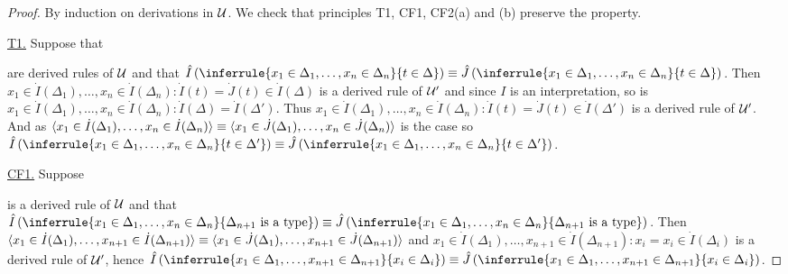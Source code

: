   \begin{proof}
    By induction on derivations in $\mathcal{U}$.
    We check that principles T1, CF1, CF2(a) and (b) preserve the property.

    \underline{T1.} Suppose that
    are derived rules of $\mathcal{U}$ and that $\hat{I}\left(\inferrule{x_1 \in \Delta_1, \dots, x_n \in \Delta_n}{t \in \Delta}\right) \equiv \hat{J}\left(\inferrule{x_1 \in \Delta_1, \dots, x_n \in \Delta_n}{t \in \Delta}\right)$.
    Then $x_1 \in \dot{I}(\Delta_1), \dots, x_n \in \dot{I}(\Delta_n) : \dot{I}(t) = \dot{J}(t) \in \dot{I}(\Delta)$ is a derived rule of $\mathcal{U}'$ and since $I$ is an interpretation, so is $x_1 \in \dot{I}(\Delta_1), \dots, x_n \in \dot{I}(\Delta_n) : \dot{I}(\Delta) = \dot{I}(\Delta')$.
    Thus $x_1 \in \dot{I}(\Delta_1), \dots, x_n \in \dot{I}(\Delta_n) : \dot{I}(t) = \dot{J}(t) \in \dot{I}(\Delta')$ is a derived rule of $\mathcal{U}'$.
    And as $\langle x_1 \in \dot{I}(\Delta_1), \dots, x_n \in \dot{I}(\Delta_n) \rangle \equiv \langle x_1 \in \dot{J}(\Delta_1), \dots, x_n \in \dot{J}(\Delta_n) \rangle$ is the case so $\hat{I}\left(\inferrule{x_1 \in \Delta_1, \dots, x_n \in \Delta_n}{t \in \Delta'}\right) \equiv \hat{J}\left(\inferrule{x_1 \in \Delta_1, \dots, x_n \in \Delta_n}{t \in \Delta'}\right)$.

    \underline{CF1.} Suppose
    \begin{mathpar}
    \end{mathpar}
    is a derived rule of $\mathcal{U}$ and that $\hat{I}\left(\inferrule{x_1 \in \Delta_1, \dots, x_n \in \Delta_n}{\Delta_{n+1} \isatype}\right) \equiv \hat{J}\left(\inferrule{x_1 \in \Delta_1, \dots, x_n \in \Delta_n}{\Delta_{n+1} \isatype}\right)$.
    Then $\langle x_1 \in \dot{I}(\Delta_1), \dots, x_{n+1} \in \dot{I}(\Delta_{n+1}) \rangle \equiv \langle x_1 \in \dot{J}(\Delta_1), \dots, x_{n+1} \in \dot{J}(\Delta_{n+1}) \rangle$ and $x_1 \in \dot{I}(\Delta_1), \dots, x_{n+1} \in \dot{I}(\Delta_{n+1}) : x_i = x_i \in \dot{I}(\Delta_i)$ is a derived rule of $\mathcal{U}'$, hence $\hat{I}\left(\inferrule{x_1 \in \Delta_1, \dots, x_{n+1} \in \Delta_{n+1}}{x_i \in \Delta_i}\right) \equiv \hat{J}\left(\inferrule{x_1 \in \Delta_1, \dots, x_{n+1} \in \Delta_{n+1}}{x_i \in \Delta_i}\right)$.


\end{proof}
